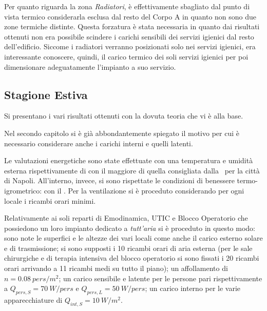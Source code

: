 Per quanto riguarda la zona \emph{Radiatori}, è effettivamente sbagliato dal punto di vista termico considerarla esclusa dal resto del Corpo A in quanto non sono due zone termiche distinte. Questa forzatura è stata necessaria in quanto dai risultati ottenuti non era possibile scindere i carichi sensibili dei servizi igienici dal resto dell'edificio. Siccome i radiatori verranno posizionati solo nei servizi igienici, era interessante conoscere, quindi, il carico termico dei soli servizi igienici per poi dimensionare adeguatamente l'impianto a suo servizio. 

\subsection{Stagione Estiva}
Si presentano i vari risultati ottenuti con la dovuta teoria che vi è alla base.

Nel secondo capitolo si è già abbondantemente spiegato il motivo per cui è necessario considerare anche i carichi interni e quelli latenti.

Le valutazioni energetiche sono state effettuate con una temperatura e umidità esterna rispettivamente di  con il  maggiore di quella consigliata dalla \norvent\ per la città di Napoli. All'interno, invece, si sono rispettate le condizioni di benessere termo-igrometrico:  con il . Per la ventilazione si è proceduto considerando per ogni locale i ricambi orari minimi.

Relativamente ai soli reparti di Emodinamica, UTIC e Blocco Operatorio che possiedono un loro impianto dedicato a \emph{tutt'aria} si è proceduto in questo modo:
sono note le superfici e le altezze dei vari locali come anche il carico esterno solare e di trasmissione; si sono supposti i \num{10} ricambi orari di aria esterna (per le sale chirurgiche e di terapia intensiva del blocco operatorio si sono fissati i \num{20} ricambi orari arrivando a \num{11} ricambi medi su tutto il piano); un affollamento di $n=\SI{0.08}{pers/m^2}$; un carico sensibile e latente per le persone pari rispettivamente a $Q_{pers,S}=\SI{70}{W/pers}$ e $Q_{pers,L}=\SI{50}{W/pers}$; un carico interno per le varie apparecchiature di $Q_{int,S}=\SI{10}{W/m^2}$. 

